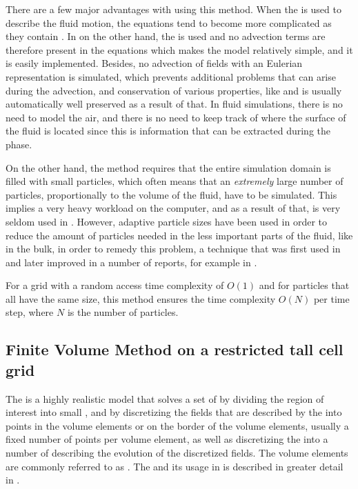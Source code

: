 There are a few major advantages with using this method. When the  is used to describe the fluid motion, the equations tend to become more complicated as they contain . In \SPH on the other hand, the  is used and no advection terms are therefore present in the equations which makes the model relatively simple, and it is easily implemented. Besides, no advection of fields with an Eulerian representation is simulated, which prevents additional problems that can arise during the advection, and conservation of various properties, like \momentum and \energy is usually automatically well preserved as a result of that. In fluid simulations, there is no need to model the air, and there is no need to keep track of where the surface of the fluid is located since this is information that can be extracted during the  phase.

On the other hand, the \SPH method requires that the entire simulation domain is filled with small particles, which often means that an \emph{extremely} large number of particles, proportionally to the volume of the fluid, have to be simulated. This implies a very heavy workload on the computer, and as a result of that, \SPH is very seldom used in . However, adaptive particle sizes have been used in order to reduce the amount of particles needed in the less important parts of the fluid, like in the bulk, in order to remedy this problem, a technique that was first used in \citep{Desbrun1999} and later improved in a number of reports, for example in \citep{Yan2009}.

For a grid with a random access time complexity of $O(1)$ and for particles that all have the same size, this method ensures the time complexity $O(N)$ per time step, where $N$ is the number of particles.

\subsection{Finite Volume Method on a restricted tall cell grid}

The \FVM is a highly realistic model that solves a set of \PDEs by dividing the region of interest into small , and by discretizing the fields that are described by the \PDEs into points in the volume elements or on the border of the volume elements, usually a fixed number of points per volume element, as well as discretizing the \PDEs into a number of \ODEs describing the evolution of the discretized fields. The volume elements are commonly referred to as \cells. The \FVM and its usage in \CFD is described in greater detail in .

